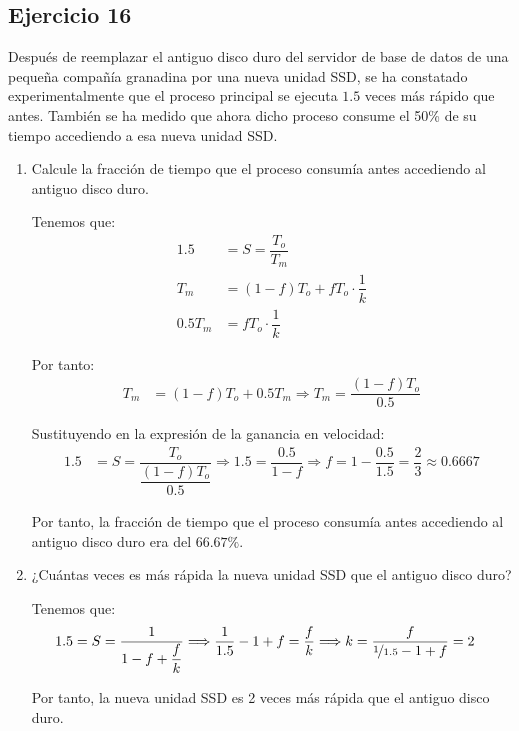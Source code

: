 \subsection*{Ejercicio 16}

Después de reemplazar el antiguo disco duro del servidor de base de datos de una pequeña compañía granadina por una nueva unidad SSD, se ha constatado experimentalmente que el proceso principal se ejecuta $1.5$ veces más rápido que antes. También se ha medido que ahora dicho proceso consume el 50\% de su tiempo accediendo a esa nueva unidad SSD.

\begin{enumerate}
    \item Calcule la fracción de tiempo que el proceso consumía antes accediendo al antiguo disco duro.
    
    Tenemos que:
    \begin{align*}
        1.5 &= S = \dfrac{T_o}{T_m}\\
        T_m &= (1-f)T_o + fT_o\cdot \dfrac{1}{k}\\
        0.5T_m &= fT_o\cdot \dfrac{1}{k}
    \end{align*}

    Por tanto:
    \begin{align*}
        T_m &= (1-f)T_o + 0.5T_m \Longrightarrow
        T_m = \dfrac{(1-f)T_o}{0.5}
    \end{align*}

    Sustituyendo en la expresión de la ganancia en velocidad:
    \begin{align*}
        1.5 &= S = \dfrac{T_o}{\dfrac{(1-f)T_o}{0.5}}\Longrightarrow
        1.5 = \dfrac{0.5}{1-f}\Longrightarrow
        f=1-\dfrac{0.5}{1.5}=\dfrac{2}{3}\approx 0.6667
    \end{align*}

    Por tanto, la fracción de tiempo que el proceso consumía antes accediendo al antiguo disco duro era del $66.67\%$.
    \item ¿Cuántas veces es más rápida la nueva unidad SSD que el antiguo disco duro?
    
    Tenemos que:
    \begin{align*}
        1.5 &= S = \dfrac{1}{1-f+\dfrac{f}{k}}
        \Longrightarrow
        \dfrac{1}{1.5}-1+f = \dfrac{f}{k}\Longrightarrow
        k=\dfrac{f}{\nicefrac{1}{1.5}-1+f} = 2
    \end{align*}

    Por tanto, la nueva unidad SSD es 2 veces más rápida que el antiguo disco duro.
\end{enumerate}


